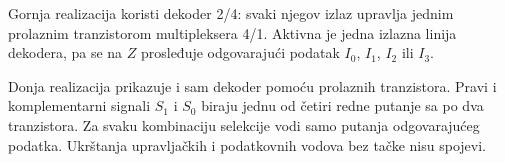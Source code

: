 Gornja realizacija koristi dekoder 2/4: svaki njegov izlaz upravlja jednim prolaznim tranzistorom multipleksera 4/1. Aktivna je jedna izlazna linija dekodera, pa se na $Z$ prosleđuje odgovarajući podatak $I_0$, $I_1$, $I_2$ ili $I_3$.

Donja realizacija prikazuje i sam dekoder pomoću prolaznih tranzistora. Pravi i komplementarni signali $S_1$ i $S_0$ biraju jednu od četiri redne putanje sa po dva tranzistora. Za svaku kombinaciju selekcije vodi samo putanja odgovarajućeg podatka. Ukrštanja upravljačkih i podatkovnih vodova bez tačke nisu spojevi.
